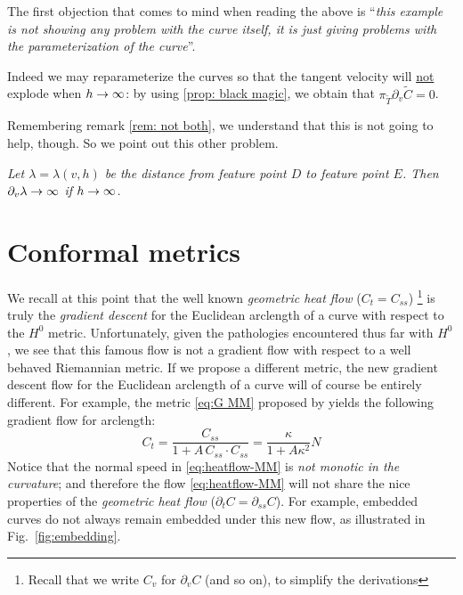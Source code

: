 \documentclass[twoside,a4paper,english]{article}
\def\derpar#1{\partial_{#1}}
\begin{document}
\bigskip

The first objection that comes to mind when reading
the above is ``\emph{this example is not showing any problem with
  the curve itself, it is just giving problems with the
  parameterization of the curve}''.

Indeed we may reparameterize the curves so that
the tangent velocity will \underline{not} explode
when $h\to\infty$:  by using  \ref{prop: black magic},
we obtain that $\pi_{\tilde T} \derpar v \tilde C=0$.

Remembering remark \ref{rem: not both}, we understand that
this is not going to help, though. So we point out this other problem.
\begin{center}\em
  Let $\lambda=\lambda(v,h)$ be the distance from feature point $D$ to feature
  point $E$. Then $\derpar v \lambda\to \infinity$ if $h\to\infty$. 
\end{center}



\section{Conformal metrics}
\label{sec: conformal}


We recall at this point that the well known {\em geometric heat flow}
($C_t=C_{ss}$)%
\footnote{Recall that we write $C_v$ for $\derpar v C$ (and so on),
  to simplify the derivations
}
is truly the {\em gradient descent} for the Euclidean
arclength of a curve with respect to the $H^0$ metric.
Unfortunately, given the pathologies encountered thus far with $H^0$, we
see that this famous flow is not a gradient flow with respect to
a well behaved Riemannian metric. If we propose a different metric,
the new gradient descent flow for the Euclidean arclength of a curve
will of course be entirely different.
For example, the metric \eqref{eq:G MM} proposed
by \cite{Michor-Mumford} yields the following gradient flow for arclength:
\begin{equation} \label{eq:heatflow-MM}
  C_t = \frac{C_{ss}}{1+A \, C_{ss}\cdot C_{ss}}
      = \frac{\kappa}{1+A\kappa^2}N
\end{equation}
Notice that the normal speed in \eqref{eq:heatflow-MM} is {\em not
monotic in the curvature}; and therefore the flow
\eqref{eq:heatflow-MM} will not
share the nice properties of the  {\em geometric heat flow}
($\partial_t C=\partial_{ss} C$). For example, embedded curves
do not always remain embedded under this new flow, as illustrated
in Fig.~\vref{fig:embedding}.
\end{document}
